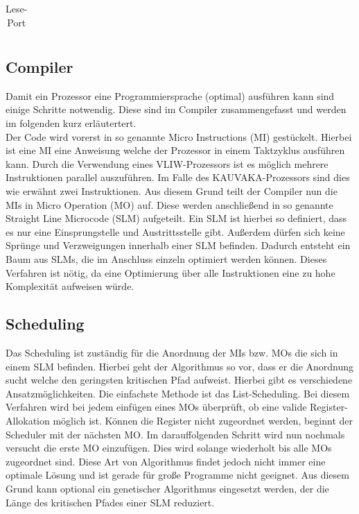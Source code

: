 \begin{table}[htbp]
\begin{minipage}{.5\textwidth}
\begin{tabular}{cccccccccccccccccc}
		\end{tabular}
		\caption{\label{lese-port}Lese-Port}
	\end{minipage}
\end{table}


\newpage
\subsection{Compiler}
Damit ein Prozessor eine Programmiersprache (optimal) ausführen kann sind einige Schritte notwendig. Diese sind im Compiler zusammengefasst und werden im folgenden kurz erläutertert.\\
Der Code wird vorerst in so genannte Micro Instructions (MI) gestückelt.  Hierbei ist eine MI eine Anweisung welche der Prozessor in einem Taktzyklus ausführen kann. Durch die Verwendung eines VLIW-Prozessors ist es möglich mehrere Instruktionen parallel auszuführen. Im Falle des KAUVAKA-Prozessors sind dies wie erwähnt zwei Instruktionen. Aus diesem Grund teilt der Compiler nun die MIs in Micro Operation (MO) auf. Diese werden anschließend in so genannte \glqq Straight Line Microcode\grqq{} (SLM) aufgeteilt. Ein SLM ist hierbei so definiert, dass es nur eine Einsprungstelle und Austrittsstelle gibt. Außerdem dürfen sich keine Sprünge und Verzweigungen innerhalb einer SLM befinden.  Dadurch entsteht ein Baum aus SLMs, die im Anschluss einzeln optimiert werden können. Dieses Verfahren ist nötig, da eine Optimierung über alle Instruktionen eine zu hohe Komplexität aufweisen würde. \cite{landskov1980local}
\subsection{Scheduling}
\label{sec:scheduling}
Das Scheduling ist zuständig für die Anordnung der MIs bzw. MOs die sich in einem SLM befinden. Hierbei geht der Algorithmus so vor, dass er die Anordnung sucht welche den geringsten kritischen Pfad aufweist. Hierbei gibt es verschiedene Ansatzmöglichkeiten. Die einfachste Methode ist das List-Scheduling. Bei diesem Verfahren wird bei jedem einfügen eines MOs überprüft, ob eine valide Register-Allokation möglich ist. Können die Register nicht zugeordnet werden, beginnt der Scheduler mit der nächsten MO. Im darauffolgenden Schritt wird nun nochmals versucht die erste MO einzufügen. Dies wird solange wiederholt bis alle MOs zugeordnet sind.\cite{landskov1980local}
Diese Art von Algorithmus findet jedoch nicht immer eine optimale Lösung und ist gerade für große Programme nicht geeignet. Aus diesem Grund kann optional ein genetischer Algorithmus eingesetzt werden, der die Länge des kritischen Pfades einer SLM reduziert.



